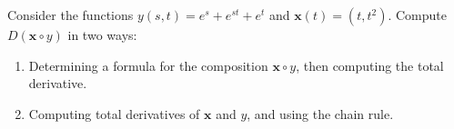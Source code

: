 \begin{problem}
Consider the functions $y(s,t) = e^s + e^{st} + e^t$ and $\mathbf{x}(t) = (t, t^2)$. Compute $D(\mathbf{x}\circ y)$ in two ways:
\begin{enumerate}
\item Determining a formula for the composition $\mathbf{x}\circ y$, then computing the total derivative.
\item Computing total derivatives of $\mathbf{x}$ and $y$, and using the chain rule.
\end{enumerate}
\end{problem}